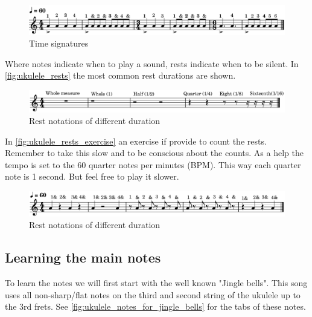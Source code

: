 \begin{figure}[h]
	\centering
	\includegraphics[width=\textwidth]{../../MuseScore/Ukulele/MusicNotation/TimeSignature.png}
	\caption{Time signatures}
	\label{fig:ukulele_time_signatures}
\end{figure}

\newpage

Where notes indicate when to play a sound, rests indicate when to be silent. In \autoref{fig:ukulele_rests} the most common rest durations are shown.

\begin{figure}[h]
	\centering
	\includegraphics[width=\textwidth]{../../MuseScore/Ukulele/UkuleleRests.png}
	\caption{Rest notations of different duration}
	\label{fig:ukulele_rests}
\end{figure}

In \autoref{fig:ukulele_rests_exercise} an exercise if provide to count the rests. Remember to take this slow and to be conscious about the counts. As a help the tempo is set to the 60 quarter notes per minutes (BPM). This way each quarter note is 1 second. But feel free to play it slower.

\begin{figure}[h]
	\centering
	\includegraphics[width=\textwidth]{../../MuseScore/Ukulele/UkuleleRestsExercise.png}
	\caption{Rest notations of different duration}
	\label{fig:ukulele_rests_exercise}
\end{figure}

\newpage

\subsection{Learning the main notes}

To learn the notes we will first start with the well known "Jingle bells". This song uses all non-sharp/flat notes on the third and second string of the ukulele up to the 3rd frets. See \autoref{fig:ukulele_notes_for_jingle_bells} for the tabs of these notes.

